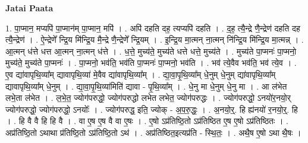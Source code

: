 \documentclass[17pt]{extarticle}
\begin{document}
\textbf{Jatai Paata} \newline

1. पा॒प्मान॒ मप्यपि॑ पा॒प्मान॑म् पा॒प्मान॒ मपि॑ । . अपि॑ दहति दह॒ त्यप्यपि॑ दहति । . द॒ह॒ त्यै॒न्द्रे णै॒न्द्रेण॑ दहति दह त्यै॒न्द्रेण॑ । . ऐ॒न्द्रेणे᳚ न्द्रि॒य मि॑न्द्रि॒य मै॒न्द्रे णै॒न्द्रेणे᳚ न्द्रि॒यम् । . इ॒न्द्रि॒य मा॒त्मन् ना॒त्मन् नि॑न्द्रि॒य मि॑न्द्रि॒य मा॒त्मन्न् । . आ॒त्मन् ध॑त्ते धत्त आ॒त्मन् ना॒त्मन् ध॑त्ते । . ध॒त्ते॒ मुच्य॑ते॒ मुच्य॑ते धत्ते धत्ते॒ मुच्य॑ते । . मुच्य॑ते पा॒प्मनः॑ पा॒प्मनो॒ मुच्य॑ते॒ मुच्य॑ते पा॒प्मनः॑ । . पा॒प्मनो॒ भव॑ति॒ भव॑ति पा॒प्मनः॑ पा॒प्मनो॒ भव॑ति । . भव॑ त्ये॒वैव भव॑ति॒ भव॑ त्ये॒व । . ए॒व द्या॑वापृथि॒व्या᳚म् द्यावापृथि॒व्या॑ मे॒वैव द्या॑वापृथि॒व्या᳚म् । . द्या॒वा॒पृ॒थि॒व्या᳚म् धे॒नुम् धे॒नुम् द्या॑वापृथि॒व्या᳚म् द्यावापृथि॒व्या᳚म् धे॒नुम् । . द्या॒वा॒पृ॒थि॒व्या॑मिति॑ द्यावा - पृ॒थि॒व्या᳚म् । . धे॒नु मा धे॒नुम् धे॒नु मा । . आ ल॑भेत लभे॒ता ल॑भेत । . ल॒भे॒त॒ ज्योग॑परुद्धो॒ ज्योग॑परुद्धो लभेत लभेत॒ ज्योग॑परुद्धः । . ज्योग॑परुद्धो॒ ऽनयो॑र॒नयो॒र् ज्योग॑परुद्धो॒ ज्योग॑परुद्धो॒ ऽनयोः᳚ । . ज्योग॑परुद्ध॒ इति॒ ज्योक् - अ॒प॒रु॒द्धः॒ । . अ॒नयो॒र्॒. हि ह्य॑नयो॑ र॒नयो॒र्॒. हि । . हि वै वै हि हि वै । . वा ए॒ष ए॒ष वै वा ए॒षः । . ए॒षो ऽप्र॑तिष्ठि॒तो ऽप्र॑तिष्ठित ए॒ष ए॒षो ऽप्र॑तिष्ठितः । . अप्र॑तिष्ठि॒तो ऽथाथा प्र॑तिष्ठि॒तो ऽप्र॑तिष्ठि॒तो ऽथ॑ । . अप्र॑तिष्ठित॒इत्यप्र॑ति - स्थि॒तः॒ । . अथै॒ष ए॒षो ऽथा थै॒षः । \newline
\end{document}

